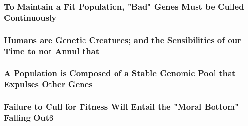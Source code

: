 \documentclass[UTF8]{article}
\begin{document}
	\subsubsection{To Maintain a Fit Population, "Bad" Genes Must be Culled Continuously}
	\subsubsection{Humans are Genetic Creatures; and the Sensibilities of our Time to not Annul that}
	\subsubsection{A Population is Composed of a Stable Genomic Pool that Expulses Other Genes }
	\subsubsection{Failure to Cull for Fitness Will Entail the "Moral Bottom" Falling Out6}
	
\end{document}
